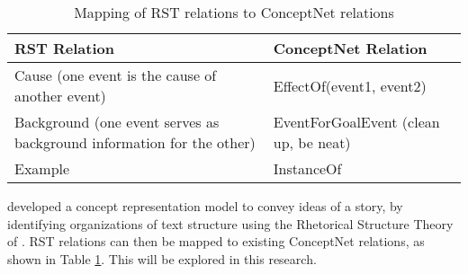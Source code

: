 \begin{table}[ht]   %
\centering
\caption{Mapping of RST relations to ConceptNet relations} \vspace{0.25em}
\begin{tabular}{|p{7cm}|l|} \hline
RST Relation & ConceptNet Relation \\ \hline
Cause (one event is the cause of another event) & EffectOf(event1, event2) \\ \hline
Background (one event serves as background information for the other) & EventForGoalEvent (clean up, be neat) \\ \hline
Example & InstanceOf \\ \hline
\end{tabular}
\label{tab:mappingrstconceptnet}
\end{table}

 developed a concept representation model to convey ideas of a story, by identifying organizations of text structure using the Rhetorical Structure Theory of . RST relations can then be mapped to existing ConceptNet relations, as shown in Table \ref{tab:mappingrstconceptnet}. This will be explored in this research.





